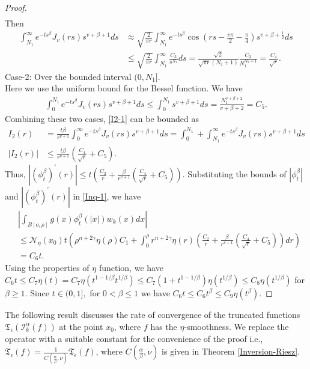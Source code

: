 \documentclass[11pt,a4paper,reqno]{amsproc}
\theoremstyle{definition}
\theoremstyle{remark}
\numberwithin{equation}{section}
\begin{document}
\begin{proof}
\begin{align*}
\end{align*}
Then 
\begin{align*}
    \int_{N_1}^\infty e^{-ts^\beta} J_v(rs)s^{v+\beta+1}ds & \approx  \sqrt{\frac{2}{\pi r}}\int_{N_1}^\infty e^{-ts^\beta} \cos{\left(rs-\frac{v\pi}{2}-\frac{\pi}{4}\right)} s^{v+\beta+\frac{1}{2}}ds\\
    & \leq \sqrt{\frac{2}{\pi r}}\int_{N_1}^{\infty} \frac{C_3}{s^{N_1}} ds = \frac{\sqrt{2}}{\sqrt{\pi r} (N_2+1)} \frac{C_3}{N_1^{N_2+1}} = \frac{C_4}{\sqrt{r}}. 
\end{align*}
Case-2: Over the bounded interval $(0, N_1]$. \\
Here we use the uniform bound for the Bessel function. We have
\begin{align*}
    \int_0^{N_1}e^{-ts^\beta} J_v(rs)s^{v+\beta+1}ds \leq \int_0^{N_1} s^{v+\beta+1}ds  = \frac{N_1^{v+\beta+2}}{v+\beta+2} = C_5.
\end{align*}
Combining these two cases, \eqref{I2-1} can be bounded as 
\begin{align*}
    I_2(r)&=\frac{t\beta}{r^{v+1}} \int_0^\infty e^{-ts^\beta}J_v(rs)s^{v+\beta+1} ds = \int_0^{N_1}+\int_{N_1}^\infty e^{-ts^\beta}J_v(rs)s^{v+\beta+1} ds \\
  |I_2(r)|  & \leq \frac{t\beta}{r^{v+1}} \left( \frac{C_4}{\sqrt{r}} + C_5 \right).
\end{align*}
Thus, $|(\phi_t^\beta)^{\prime}(r)| \leq  t \left(\frac{C_2}{r}+ \frac{\beta}{r^{v+1}}\left( \frac{C_4}{\sqrt{r}} + C_5 \right)
\right)$.
Substituting the bounds of $|\phi_t^\beta|$ and $|(\phi_t^\beta)^{\prime}(r)|$ in \eqref{Inq-1}, we have 
\begin{align*}
   & \left| \int_{B[o,\rho]} g(x)\phi_t^\beta(|x|) w_k(x)dx
    \right| \\
    & \leq \mathcal{N}_{\eta}(x_0)t \left( \rho^{n+2\gamma} \eta(\rho) C_1 
    +\int_0^\rho r^{n+2\gamma}\eta(r) 
     \left(\frac{C_2}{r}+ \frac{\beta}{r^{v+1}}\left(\frac{C_4}{\sqrt{r}} + C_5 \right)
\right)
   dr \right)\\
   &= C_6t.
\end{align*}
Using the properties of $\eta$ function, we have  $C_6t \leq C_7\eta(t) = C_7\eta(t^{1-1/\beta}t^{1/\beta}) \leq C_7(1+t^{1-1/\beta})\eta(t^{1/\beta}) \leq C_8\eta(t^{1/\beta})$ for $\beta\geq 1$. Since $t\in (0,1],$ for $0<\beta \leq 1$ we have $C_6 t\leq C_6 t^\beta \leq C_9\eta(t^\beta)$.
\end{proof}
The following result discusses the rate of convergence of the truncated functions $\mathfrak{T}_{\epsilon}(\mathcal{I}_k^\alpha (f))$ at the point $x_0$, where $f$ has the $\eta$-smoothness. We replace the operator with a suitable constant for the convenience of the proof i.e., $\mathfrak{T}_{\epsilon}(f)= \frac{1}{C(\frac{\alpha}{\beta},\nu)}\mathfrak{T}_{\epsilon}(f)$, where   $C(\frac{\alpha}{\beta},\nu)$ is given in Theorem \ref{Inversion-Riesz}.
\end{document}
